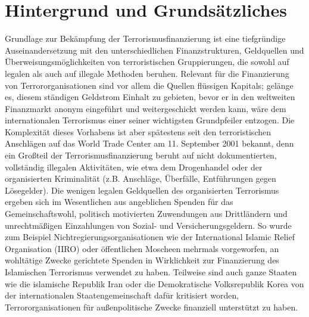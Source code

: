 \documentclass[a4paper,11pt]{article}
\begin{document}
	\section{Hintergrund und Grundsätzliches}
Grundlage zur Bekämpfung der Terrorismusfinanzierung ist eine tiefgründige Auseinandersetzung mit den unterschiedlichen Finanzstrukturen, Geldquellen und Überweisungsmöglichkeiten von terroristischen Gruppierungen, die sowohl auf legalen als auch auf illegale Methoden beruhen. Relevant für die Finanzierung von Terrororganisationen sind vor allem die Quellen flüssigen Kapitals; gelänge es, diesem ständigen Geldstrom Einhalt zu gebieten, bevor er in den weltweiten Finanzmarkt anonym eingeführt und weitergeschickt werden kann, wäre dem internationalen Terrorismus einer seiner wichtigsten Grundpfeiler entzogen. Die Komplexität dieses Vorhabens ist aber spätestens seit den terroristischen Anschlägen auf das World Trade Center am 11. September 2001 bekannt, denn ein Großteil der Terrorismusfinanzierung beruht auf nicht dokumentierten, vollständig illegalen Aktivitäten, wie etwa dem Drogenhandel oder der organisierten Kriminalität (z.B. Anschläge, Überfälle, Entführungen gegen Lösegelder). Die wenigen legalen Geldquellen des organisierten Terrorismus ergeben sich im Wesentlichen aus angeblichen Spenden für das Gemeinschaftswohl, politisch motivierten Zuwendungen aus Drittländern und unrechtmäßigen Einzahlungen von Sozial- und Versicherungsgeldern. So wurde zum Beispiel Nichtregierungsorganisationen wie der International Islamic Relief Organisation (IIRO) oder öffentlichen Moscheen mehrmals vorgeworfen, an wohltätige Zwecke gerichtete Spenden in Wirklichkeit zur Finanzierung des Islamischen Terrorismus verwendet zu haben. Teilweise sind auch ganze Staaten wie die islamische Republik Iran oder die Demokratische Volksrepublik Korea von der internationalen Staatengemeinschaft dafür kritisiert worden, Terrororganisationen für außenpolitische Zwecke finanziell unterstützt zu haben.
\\ \\
\end{document}
